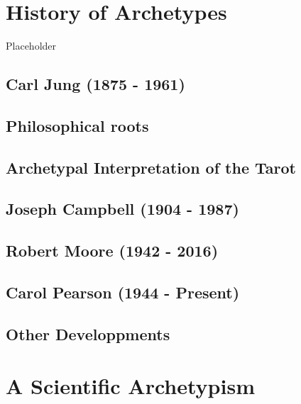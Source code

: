 \documentclass[
]{book}
\begin{document}
\hypertarget{history-of-archetypes}{%
\chapter{History of Archetypes}\label{history-of-archetypes}}

Placeholder

\hypertarget{carl-jung-1875---1961}{%
\section{Carl Jung (1875 - 1961)}\label{carl-jung-1875---1961}}

\hypertarget{philosophical-roots}{%
\section{Philosophical roots}\label{philosophical-roots}}

\hypertarget{archetypal-interpretation-of-the-tarot}{%
\section{Archetypal Interpretation of the Tarot}\label{archetypal-interpretation-of-the-tarot}}

\hypertarget{joseph-campbell-1904---1987}{%
\section{Joseph Campbell (1904 - 1987)}\label{joseph-campbell-1904---1987}}

\hypertarget{robert-moore-1942---2016}{%
\section{Robert Moore (1942 - 2016)}\label{robert-moore-1942---2016}}

\hypertarget{carol-pearson-1944---present}{%
\section{Carol Pearson (1944 - Present)}\label{carol-pearson-1944---present}}

\hypertarget{other-developpments}{%
\section{Other Developpments}\label{other-developpments}}

\hypertarget{a-scientific-archetypism}{%
\chapter{A Scientific Archetypism}\label{a-scientific-archetypism}}
\end{document}
